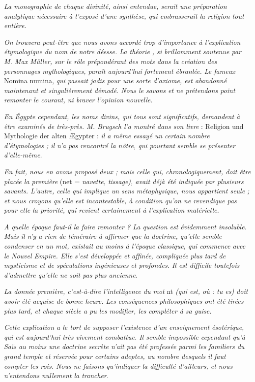 \documentclass[a4paper, 11pt, oneside]{article}
\begin{document}
\emph{La monographie de chaque divinité, ainsi entendue, serait une préparation analytique nécessaire à l'exposé d'une synthèse, qui embrasserait la religion tout entière.}

\emph{On trouvera peut-être que nous avons accordé trop d'importance à l'explication étymologique du nom de notre déesse. La théorie , si brillamment soutenue par M. Max Müller, sur le rôle prépondérant des mots dans la création des personnages mythologiques, paraît aujourd'hui fortement ébranlée. Le fameux} Nomina numina, \emph{qui passait jadis pour une sorte d'axiome, est abandonné maintenant et singulièrement démodé. Nous le savons et ne prétendons point remonter le courant, ni braver l'opinion nouvelle.}

\emph{En Égypte cependant, les noms divins, qui tous sont significatifs, demandent à être examinés de très-près. M. Brugsch l'a montré dans son livre} : Religion und Mythologie der alten Ægypter : \emph{il a même essayé un certain nombre d'étymologies ; il n'a pas rencontré la nôtre, qui pourtant semble se présenter d'elle-même.}

\emph{En fait, nous en avons proposé deux ; mais celle qui, chronologiquement, doit être placée la première} (net = \emph{navette, tissage), avait déjà été indiquée par plusieurs savants. L'autre, celle qui implique un sens métaphysique, nous appartient seule ; et nous croyons qu'elle est incontestable, à condition qu'on ne revendique pas pour elle la priorité, qui revient certainement à l'explication matérielle.}

\emph{A quelle époque faut-il la faire remonter ? La question est évidemment insoluble. Mais il n'y a rien de téméraire à affirmer que la doctrine, qu'elle semble condenser en un mot, existait au moins à l'époque classique, qui commence avec le Nouvel Empire. Elle s'est développée et affinée, compliquée plus tard de mysticisme et de spéculations ingénieuses et profondes. Il est difficile toutefois d'admettre qu'elle ne soit pas plus ancienne.}

\emph{La donnée première, c'est-à-dire l'intelligence du mot} nt \emph{(qui est, où : tu es) doit avoir été acquise de bonne heure. Les conséquences philosophiques ont été tirées plus tard, et chaque siècle a pu les modifier, les compléter à sa guise.}

\emph{Cette explication a le tort de supposer l'existence d'un enseignement ésotérique, qui est aujourd'hui très vivement combattue. Il semble impossible cependant qu'à Saïs au moins
une doctrine secrète n'ait pas été professée parmi les familiers du grand temple et réservée pour certains adeptes, au nombre desquels il faut compter les rois. Nous ne faisons qu'indiquer la difficulté d'ailleurs, et nous n'entendons nullement la trancher.}
\end{document}

